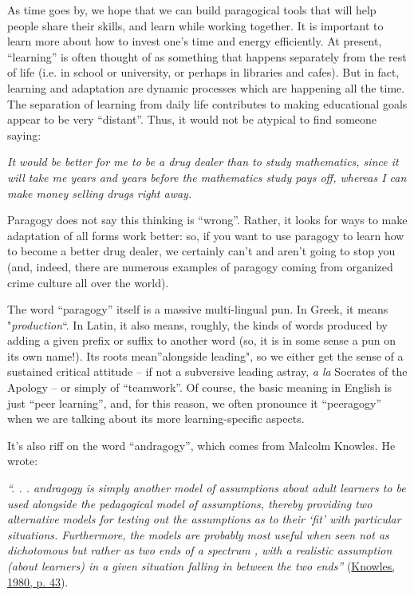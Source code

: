 As time goes by, we hope that we can build paragogical tools that will
help people share their skills, and learn while working together. It is
important to learn more about how to invest one's time and energy
efficiently. At present, ``learning'' is often thought of as something
that happens separately from the rest of life (i.e. in school or
university, or perhaps in libraries and cafes). But in fact, learning
and adaptation are dynamic processes which are happening all the time.
The separation of learning from daily life contributes to making
educational goals appear to be very ``distant''. Thus, it would not be
atypical to find someone saying:

\emph{It would be better for me to be a drug dealer than to study
mathematics, since it will take me years and years before the
mathematics study pays off, whereas I can make money selling drugs right
away.}

Paragogy does not say this thinking is ``wrong''. Rather, it looks for
ways to make adaptation of all forms work better: so, if you want to use
paragogy to learn how to become a better drug dealer, we certainly can't
and aren't going to stop you (and, indeed, there are numerous examples
of paragogy coming from organized crime culture all over the world).

The word ``paragogy'' itself is a massive multi-lingual pun. In Greek,
it means "\emph{production}``. In Latin, it also means, roughly, the
kinds of words produced by adding a given prefix or suffix to another
word (so, it is in some sense a pun on its own name!). Its roots
mean''alongside leading", so we either get the sense of a sustained
critical attitude -- if not a subversive leading astray, \emph{a la}
Socrates of the Apology -- or simply of ``teamwork''. Of course, the
basic meaning in English is just ``peer learning'', and, for this
reason, we often pronounce it ``peeragogy'' when we are talking about
its more learning-specific aspects.

It's also riff on the word ``andragogy'', which comes from Malcolm
Knowles. He wrote:

\emph{``. . . andragogy is simply another model of assumptions about
adult learners to be used alongside the pedagogical model of
assumptions, thereby providing two alternative models for testing out
the assumptions as to their `fit' with particular situations.
Furthermore, the models are probably most useful when seen not as
dichotomous but rather as two ends of a spectrum , with a realistic
assumption (about learners) in a given situation falling in between the
two ends''}
(\href{http://openlibrary.org/works/OL10335330W/The\_modern\_practice\_of\_adult\_education}{Knowles,
1980, p. 43}).

